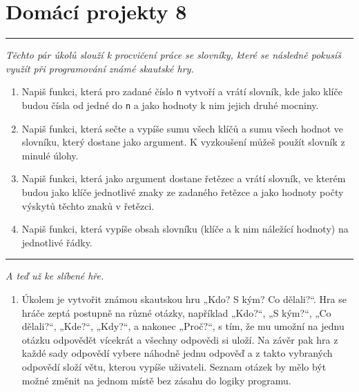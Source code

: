 \documentclass[a4paper,10pt]{article}
\newcommand\plsetno{8}
\newcommand\startsection[1]{
     \vspace{0.2ex}
    \hrule
    {\fontspec{Oxygen} \tiny
     \vspace{-1ex}
     \emph{#1}
     \vspace{-1.5em}
    }
}
\begin{document}
\section*{Domácí projekty \plsetno}

\startsection{Těchto pár úkolů slouží k procvičení práce se slovníky, které se
    následně pokusíš využít při programování známé skautské hry.}

\begin{enumerate}

\item Napiš funkci, která pro zadané číslo \texttt{n} vytvoří a vrátí slovník,
    kde jako klíče budou čísla od jedné do \texttt{n} a jako hodnoty k nim
    jejich druhé mocniny.

\item Napiš funkci, která sečte a vypíše sumu všech klíčů a sumu všech hodnot
    ve slovníku, který dostane jako argument. K vyzkoušení můžeš použít
    slovník z minulé úlohy.

\item Napiš funkci, která jako argument dostane řetězec a vrátí slovník,
    ve kterém budou jako klíče jednotlivé znaky ze zadaného řetězce a jako
    hodnoty počty výskytů těchto znaků v řetězci.

\item Napiš funkci, která vypíše obsah slovníku (klíče a k nim náležící
    hodnoty) na jednotlivé řádky.

\end{enumerate}

\startsection{A teď už ke slíbené hře.}

\begin{enumerate}[resume]

\item Úkolem je vytvořit známou skautskou hru „Kdo? S kým? Co dělali?“. Hra se
    hráče zeptá postupně na různé otázky, například „Kdo?“, „S kým?“,
    „Co dělali?“, „Kde?“, „Kdy?“, a nakonec „Proč?“, s tím, že mu umožní
    na jednu otázku odpovědět vícekrát a všechny odpovědi si uloží.
    Na závěr pak hra z každé sady odpovědí vybere náhodně jednu odpověď
    a z takto vybraných odpovědí složí větu, kterou vypíše uživateli.
    Seznam otázek by mělo být možné změnit na jednom místě bez zásahu
    do logiky programu.

\end{enumerate}
\end{document}
